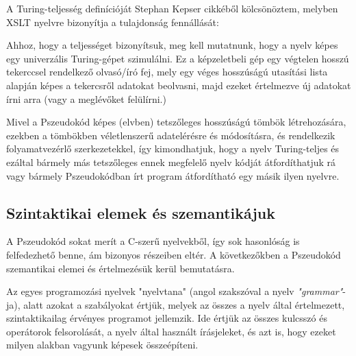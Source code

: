 A Turing-teljesség definícióját Stephan Kepser cikkéből kölcsönöztem, melyben XSLT nyelvre bizonyítja a tulajdonság fennállását:

\cite{turing}

Ahhoz, hogy a teljességet bizonyítsuk, meg kell mutatnunk, hogy a nyelv képes egy univerzális Turing-gépet szimulálni. Ez a képzeletbeli gép egy végtelen hosszú tekerccsel rendelkező olvasó/író fej, mely egy véges hosszúságú utasítási lista alapján képes a tekercsről adatokat beolvasni, majd ezeket értelmezve új adatokat írni arra (vagy a meglévőket felülírni.)

Mivel a Pszeudokód képes (elvben) tetszőleges hosszúságú tömbök létrehozására, ezekben a tömbökben véletlenszerű adatelérésre és módosításra, és rendelkezik folyamatvezérlő szerkezetekkel, így kimondhatjuk, hogy a nyelv Turing-teljes és ezáltal bármely más tetszőleges ennek megfelelő nyelv kódját átfordíthatjuk rá vagy bármely Pszeudokódban írt program átfordítható egy másik ilyen nyelvre.

\subsection{Szintaktikai elemek és szemantikájuk}

A Pszeudokód sokat merít a C-szerű nyelvekből, így sok hasonlóság is felfedezhető benne, ám bizonyos részeiben eltér. A következőkben a Pszeudokód szemantikai elemei és értelmezésük kerül bemutatásra.

Az egyes programozási nyelvek "nyelvtana" (angol szakszóval a nyelv \textit{"grammar"}-ja), alatt azokat a szabályokat értjük, melyek az összes a nyelv által értelmezett, szintaktikailag érvényes programot jellemzik. Ide értjük az összes kulcsszó és operátorok felsorolását, a nyelv által használt írásjeleket, és azt is, hogy ezeket milyen alakban vagyunk képesek összeépíteni.


